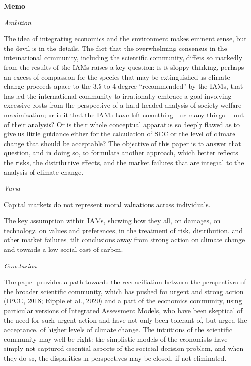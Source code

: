 \documentclass[
]{book}
\begin{document}
\textbf{Memo}

\emph{Ambition}

The idea of integrating economics and the environment makes eminent sense, but the devil
is in the details. The fact that the overwhelming consensus in the international community,
including the scientific community, differs so markedly from the results of the IAMs raises a
key question: is it sloppy thinking, perhaps an excess of compassion for the species that
may be extinguished as climate change proceeds apace to the 3.5 to 4 degree
``recommended'' by the IAMs, that has led the international community to irrationally
embrace a goal involving excessive costs from the perspective of a hard-headed analysis of
society welfare maximization; or is it that the IAMs have left something---or many things---
out of their analysis? Or is their whole conceptual apparatus so deeply flawed as to give us
little guidance either for the calculation of SCC or the level of climate change that should be
acceptable? The objective of this paper is to answer that question, and in doing so, to
formulate another approach, which better reflects the risks, the distributive effects, and the
market failures that are integral to the analysis of climate change.

\emph{Varia}

Capital markets do not represent moral valuations across individuals.

The key assumption within IAMs, showing how they all, on
damages, on technology, on values and preferences, in the treatment of risk, distribution,
and other market failures, tilt conclusions away from strong action on climate change and
towards a low social cost of carbon.

\emph{Conclusion}

The paper provides a path towards the reconciliation between the perspectives of the
broader scientific community, which has pushed for urgent and strong action (IPCC, 2018;
Ripple et al., 2020) and a part of the economics community, using particular versions of
Integrated Assessment Models, who have been skeptical of the need for such urgent action
and have not only been tolerant of, but urged the acceptance, of higher levels of climate
change. The intuitions of the scientific community may well be right: the simplistic models
of the economists have simply not captured essential aspects of the societal decision
problem, and when they do so, the disparities in perspectives may be closed, if not
eliminated.
\end{document}
